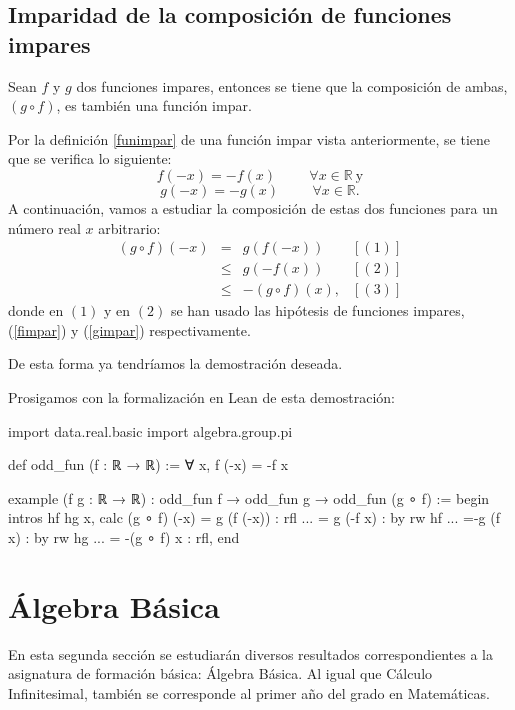 \subsection{Imparidad de la composición de funciones impares}
\begin{teorema}
  Sean \(f\) y \(g\) dos funciones impares, entonces
  se tiene que la composición de ambas,
  \( (g ∘ f)\), es también una función impar.
\end{teorema}
\begin{demostracion}
  Por la definición \ref{funimpar} de una función impar
  vista anteriormente, se tiene que se verifica lo siguiente:
  \begin{equation}\label{fimpar}
  f(-x)=-f(x)\hspace{1cm}∀ x ∈ ℝ \ \text{y}
  \end{equation}
  \begin{equation}\label{gimpar}
  g(-x)=-g(x)\hspace{1cm}∀ x ∈ ℝ.
  \end{equation}
  A continuación, vamos a estudiar la composición de estas dos funciones
  para un número real \(x\) arbitrario:
  \[\begin{array}{llll}
  	(g ∘ f)(-x) &= &g(f(-x))   & [(1)]\\
                    &≤ &g(-f(x)) & [(2)] \\
                    &≤ &-(g ∘ f)(x),& [(3)]
  \end{array}\]
  donde en \((1)\) y en \((2)\) se han usado las hipótesis de funciones
  impares, (\ref{fimpar}) y (\ref{gimpar}) respectivamente.

  De esta forma ya tendríamos la demostración deseada.
\end{demostracion}

Prosigamos con la formalización en Lean de esta demostración:
\begin{leancode}
import data.real.basic
import algebra.group.pi

def odd_fun (f : ℝ → ℝ) := ∀ x, f (-x) = -f x

example (f g : ℝ → ℝ) : odd_fun f → odd_fun g →  odd_fun (g ∘ f) :=
begin
intros hf hg x,
calc (g ∘ f) (-x)
    = g (f (-x)) : rfl
... = g (-f x)   : by rw hf
... =-g (f x)    : by rw hg
... = -(g ∘ f) x : rfl,
end
\end{leancode}

\section{Álgebra Básica}
En esta segunda sección se estudiarán diversos resultados
correspondientes a la asignatura de formación básica: Álgebra Básica.
Al igual que Cálculo Infinitesimal, también se corresponde al primer
año del grado en Matemáticas.

